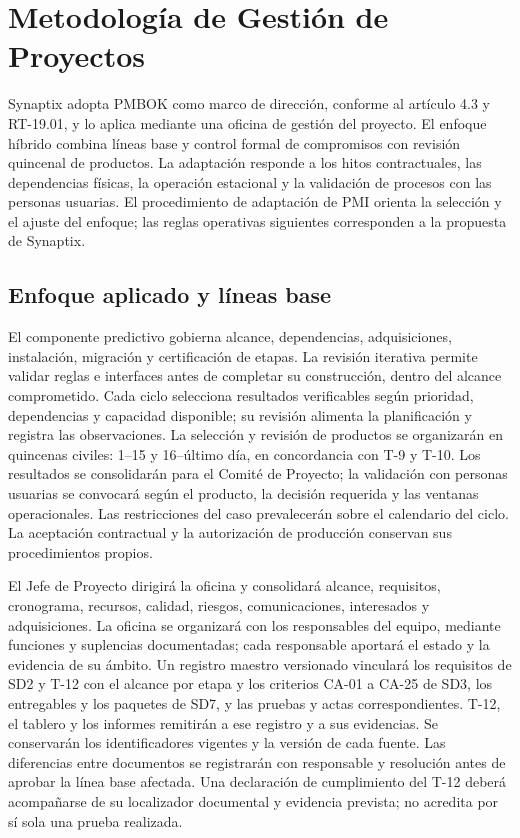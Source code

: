 \section{Metodología de Gestión de Proyectos}
Synaptix adopta PMBOK como marco de dirección, conforme al artículo 4.3 y RT-19.01, y lo aplica mediante una oficina de gestión del proyecto. El enfoque híbrido combina líneas base y control formal de compromisos con revisión quincenal de productos. La adaptación responde a los hitos contractuales, las dependencias físicas, la operación estacional y la validación de procesos con las personas usuarias. El procedimiento de adaptación de PMI orienta la selección y el ajuste del enfoque; las reglas operativas siguientes corresponden a la propuesta de Synaptix. \parencites[art.~4.3, pp.~5--6]{sd6-ba}[RT-19.01, p.~33]{sd6-bt}[pp.~1--7]{sd6-pmi-adaptacion}

\subsection{Enfoque aplicado y líneas base}
El componente predictivo gobierna alcance, dependencias, adquisiciones, instalación, migración y certificación de etapas. La revisión iterativa permite validar reglas e interfaces antes de completar su construcción, dentro del alcance comprometido. Cada ciclo selecciona resultados verificables según prioridad, dependencias y capacidad disponible; su revisión alimenta la planificación y registra las observaciones. La selección y revisión de productos se organizarán en quincenas civiles: 1--15 y 16--último día, en concordancia con T-9 y T-10. Los resultados se consolidarán para el Comité de Proyecto; la validación con personas usuarias se convocará según el producto, la decisión requerida y las ventanas operacionales. Las restricciones del caso prevalecerán sobre el calendario del ciclo. La aceptación contractual y la autorización de producción conservan sus procedimientos propios. \parencite{sd6-pmi-hibrido}

El Jefe de Proyecto dirigirá la oficina y consolidará alcance, requisitos, cronograma, recursos, calidad, riesgos, comunicaciones, interesados y adquisiciones. La oficina se organizará con los responsables del equipo, mediante funciones y suplencias documentadas; cada responsable aportará el estado y la evidencia de su ámbito. Un registro maestro versionado vinculará los requisitos de SD2 y T-12 con el alcance por etapa y los criterios CA-01 a CA-25 de SD3, los entregables y los paquetes de SD7, y las pruebas y actas correspondientes. T-12, el tablero y los informes remitirán a ese registro y a sus evidencias. Se conservarán los identificadores vigentes y la versión de cada fuente. Las diferencias entre documentos se registrarán con responsable y resolución antes de aprobar la línea base afectada. Una declaración de cumplimiento del T-12 deberá acompañarse de su localizador documental y evidencia prevista; no acredita por sí sola una prueba realizada. \parencites[secs.~3.1.2 y 3.2.4, pp.~7--11 y 19--22]{sd6-sd3}[cap.~19, pp.~143--145]{sd6-t12}

